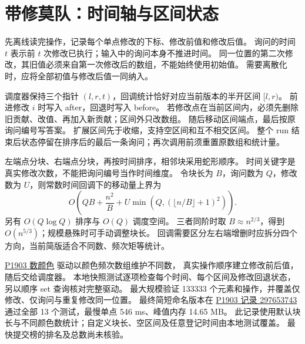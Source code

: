 \section{带修莫队：时间轴与区间状态}\label{knowledge-mo-time}
先离线读完操作，记录每个单点修改的下标、修改前值和修改后值。
询问的时间 $t$ 表示前 $t$ 次修改已执行；输入中的询问本身不推进时间。
同一位置的第二次修改，其旧值必须来自第一次修改后的数组，不能始终使用初始值。
需要离散化时，应将全部初值与修改后值一同纳入。

调度器保持三个指针 $(l,r,t)$，回调统计恰好对应当前版本的半开区间 $[l,r)$。
前进修改 $i$ 时写入 after，回退时写入 before。
若修改点在当前区间内，必须先删除旧贡献、改值、再加入新贡献；区间外只改数组。
随后移动区间端点，最后按原询问编号写答案。
扩展区间先于收缩，支持空区间和互不相交区间。
整个 run 结束后状态停留在排序后的最后一条询问；再次调用前须重置原数组和统计量。

左端点分块、右端点分块，再按时间排序，相邻块采用蛇形顺序。
时间关键字是真实修改次数，不能把询问编号当作时间维度。
令块长为 $B$，询问数为 $Q$，修改数为 $U$，则常数时间回调下的移动量上界为
\[
O\left(QB+\frac{n^2}{B}+U\min\left(Q,(\lfloor n/B\rfloor+1)^2\right)\right).
\]
另有 $O(Q\log Q)$ 排序与 $O(Q)$ 调度空间。
三者同阶时取 $B\approx n^{2/3}$，得到 $O(n^{5/3})$；规模悬殊时可手动调整块长。
回调需要区分左右端增删时应拆分四个方向，当前简版适合不同数、频次矩等统计。

\href{https://www.luogu.com.cn/problem/P1903}{P1903 数颜色} 驱动以颜色频次数组维护不同数，
真实操作顺序建立修改前后值，随后交给调度器。
本地快照测试逐项检查每个时间、每个区间及修改回退状态，另以顺序 set 查询核对完整驱动。
最大规模验证 133333 个元素和操作，并覆盖仅修改、仅询问与重复修改同一位置。
最终简短命名版本在 \href{https://www.luogu.com.cn/record/297653743}{P1903 记录 297653743}
通过全部 13 个测试，最慢单点 546 ms、峰值内存 14.65 MB。
此记录使用默认块长与不同颜色数统计；自定义块长、空区间及任意登记时间由本地测试覆盖。
最快提交榜的排名及总数尚未核验。

\newpage
